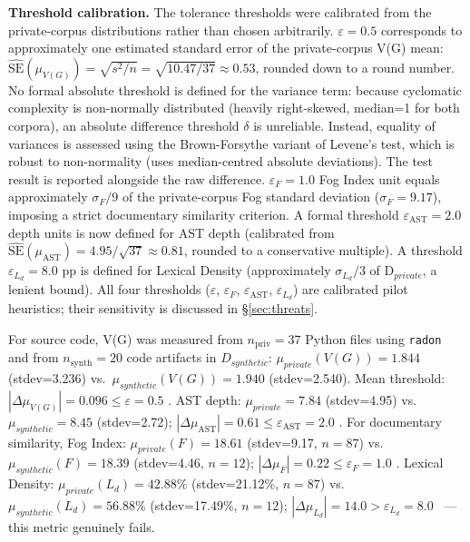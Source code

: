 \documentclass{ieeeaccess}
\begin{document}
\textbf{Threshold calibration.} The tolerance thresholds were calibrated from the private-corpus distributions rather than chosen arbitrarily.
$\varepsilon = 0.5$ corresponds to approximately one estimated standard error of the private-corpus V(G) mean:
$\widehat{\text{SE}}(\mu_{V(G)}) = \sqrt{s^2/n} = \sqrt{10.47/37} \approx 0.53$, rounded down to a round number.
No formal absolute threshold is defined for the variance term: because cyclomatic complexity is non-normally distributed (heavily right-skewed, median=1 for both corpora), an absolute difference threshold $\delta$ is unreliable. Instead, equality of variances is assessed using the Brown-Forsythe variant of Levene's test, which is robust to non-normality (uses median-centred absolute deviations). The test result is reported alongside the raw difference.
$\varepsilon_F = 1.0$ Fog Index unit equals approximately $\sigma_F/9$ of the private-corpus Fog standard deviation ($\sigma_F = 9.17$), imposing a strict documentary similarity criterion.
A formal threshold $\varepsilon_{\text{AST}}=2.0$ depth units is now defined for AST depth (calibrated from $\widehat{\text{SE}}(\mu_{\text{AST}}) = 4.95/\sqrt{37}\approx0.81$, rounded to a conservative multiple). A threshold $\varepsilon_{L_d}=8.0$ pp is defined for Lexical Density (approximately $\sigma_{L_d}/3$ of D$_{private}$, a lenient bound). All four thresholds ($\varepsilon$, $\varepsilon_F$, $\varepsilon_\text{AST}$, $\varepsilon_{L_d}$) are calibrated pilot heuristics; their sensitivity is discussed in \S\ref{sec:threats}.

For source code, V(G) was measured from $n_{\text{priv}}=37$ Python files using \texttt{radon} and from $n_{\text{synth}}=20$ code artifacts in $D_{synthetic}$: $\mu_{private}(V(G))=1.844$ (stdev=3.236) vs.\ $\mu_{synthetic}(V(G))=1.940$ (stdev=2.540). Mean threshold: $|\Delta\mu_{V(G)}|=0.096\leq\varepsilon=0.5$ \checkmark. AST depth: $\mu_{private}=7.84$ (stdev=4.95) vs.\ $\mu_{synthetic}=8.45$ (stdev=2.72); $|\Delta\mu_\text{AST}|=0.61\leq\varepsilon_\text{AST}=2.0$ \checkmark. For documentary similarity, Fog Index: $\mu_{private}(F)=18.61$ (stdev=9.17, $n=87$) vs.\ $\mu_{synthetic}(F)=18.39$ (stdev=4.46, $n=12$); $|\Delta\mu_F|=0.22\leq\varepsilon_F=1.0$ \checkmark. Lexical Density: $\mu_{private}(L_d)=42.88\%$ (stdev=21.12\%, $n=87$) vs.\ $\mu_{synthetic}(L_d)=56.88\%$ (stdev=17.49\%, $n=12$); $|\Delta\mu_{L_d}|=14.0>\varepsilon_{L_d}=8.0$ \texttimes\ --- this metric genuinely fails.
\end{document}
